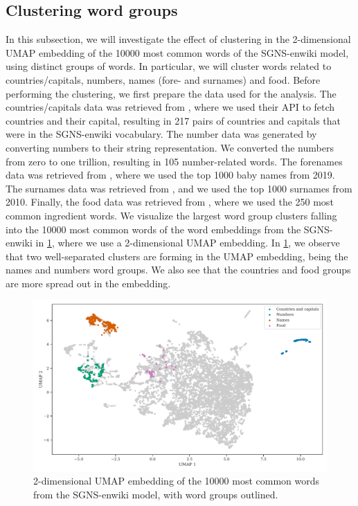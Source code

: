 \subsection{Clustering word groups}
\label{sec:clustering-word-groups}
In this subsection, we will investigate the effect of clustering in the 2-dimensional UMAP embedding of the 10000 most common words of the SGNS-enwiki model, using distinct groups of words. In particular, we will cluster words related to countries/capitals, numbers, names (fore- and surnames) and food. Before performing the clustering, we first prepare the data used for the analysis. The countries/capitals data was retrieved from \cite{GeoNames}, where we used their API to fetch countries and their capital, resulting in 217 pairs of countries and capitals that were in the SGNS-enwiki vocabulary. The number data was generated by converting numbers to their string representation. We converted the numbers from zero to one trillion, resulting in 105 number-related words. The forenames data was retrieved from \cite{SSABabyNames}, where we used the top 1000 baby names from 2019. The surnames data was retrieved from \cite{CensusSurnames}, and we used the top 1000 surnames from 2010. Finally, the food data was retrieved from \cite{FoodIngredientList}, where we used the 250 most common ingredient words. We visualize the largest word group clusters falling into the 10000 most common words of the word embeddings from the SGNS-enwiki in \cref{fig:word-cluster-all-groups}, where we use a 2-dimensional UMAP embedding. In \cref{fig:word-cluster-all-groups}, we observe that two well-separated clusters are forming in the UMAP embedding, being the names and numbers word groups. We also see that the countries and food groups are more spread out in the embedding.
\begin{figure}[H]
    \centering
    \includegraphics[width=\textwidth]{thesis/figures/word-cluster-all-groups.pdf}
    \caption{2-dimensional UMAP embedding of the 10000 most common words from the SGNS-enwiki model, with word groups outlined.}
    \label{fig:word-cluster-all-groups}
\end{figure}

